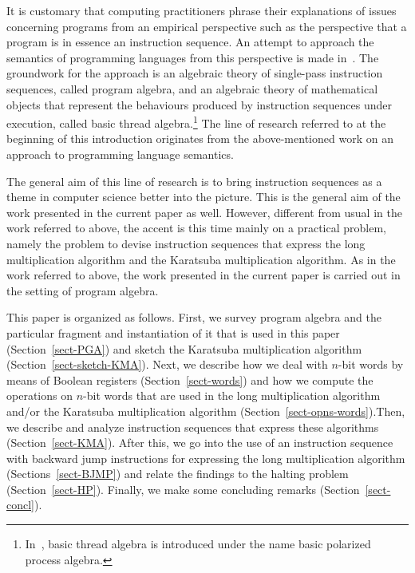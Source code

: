 \documentclass{llncs}
\begin{document}
It is customary that computing practitioners phrase their explanations 
of issues concerning programs from an empirical perspective such as 
the perspective that a program is in essence an instruction sequence.
An attempt to approach the semantics of programming languages from this 
perspective is made in~\cite{BL02a}.
The groundwork for the approach is an algebraic theory of single-pass
instruction sequences, called program algebra, and an algebraic theory
of mathematical objects that represent the behaviours produced by
instruction sequences under execution, called basic thread algebra.\footnote
{In~\cite{BL02a}, basic thread algebra is introduced under the name
 basic polarized process algebra.
}
The line of research referred to at the beginning of this introduction 
originates from the above-mentioned work on an approach to programming 
language semantics.

The general aim of this line of research is to bring instruction 
sequences as a theme in computer science better into the picture.
This is the general aim of the work presented in the current paper as 
well.
However, different from usual in the work referred to above, the accent 
is this time mainly on a practical problem, namely the problem to devise 
instruction sequences that express the long multiplication algorithm and 
the Karatsuba multiplication algorithm.
As in the work referred to above, the work presented in the current 
paper is carried out in the setting of program algebra.

This paper is organized as follows.
First, we survey program algebra and the particular fragment and 
instantiation of it that is used in this paper (Section~\ref{sect-PGA})
and sketch the Karatsuba multiplication algorithm 
(Section~\ref{sect-sketch-KMA}).
Next, we describe how we deal with $n$-bit words by means of Boolean 
registers (Section~\ref{sect-words}) and how we compute the operations 
on $n$-bit words that are used in the long multiplication algorithm 
and/or the Karatsuba multiplication algorithm 
(Section~\ref{sect-opns-words}).\linebreak[2]
Then, we describe and analyze instruction sequences that express these 
algorithms (Section~\ref{sect-KMA}).
After this, we go into the use of an instruction sequence with backward 
jump instructions for expressing the long multiplication algorithm
(Sections~\ref{sect-BJMP}) and relate the findings to the halting 
problem (Section~\ref{sect-HP}). 
Finally, we make some concluding remarks (Section~\ref{sect-concl}).
\end{document}
